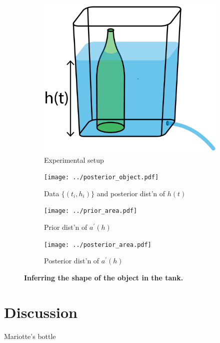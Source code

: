 \documentclass[openacc]{rsproca_new}%
\begin{document}
\begin{figure}[h!]
    \centering
        \begin{subfigure}[b]{0.3\textwidth}
    	\includegraphics[width=\textwidth]{../tank_geometry/tank_w_bottle.pdf}
	\caption{Experimental setup} \label{fig:tank_w_bottle}
    \end{subfigure}
     \begin{subfigure}[b]{0.49\textwidth}
    	\texttt{[image: ../posterior\_object.pdf]}
	\caption{Data $\{(t_i, h_i)\}$ and posterior dist'n of $h(t)$} \label{fig:posterior_object}
    \end{subfigure}
    
     \begin{subfigure}[b]{0.49\textwidth}
    	\texttt{[image: ../prior\_area.pdf]}
	\caption{Prior dist'n of $a^\prime(h)$} \label{fig:prior_area.pdf}
    \end{subfigure}
       \begin{subfigure}[b]{0.49\textwidth}
    	\texttt{[image: ../posterior\_area.pdf]}
	\caption{Posterior dist'n of $a^\prime(h)$} \label{fig:posterior_area.pdf}
    \end{subfigure}
    
  
    \caption{
      \textbf{Inferring the shape of the object in the tank.}
      }
\end{figure}

\section{Discussion}

Mariotte's bottle \cite{kirevs2006mariotte}

\enlargethispage{20pt}




\vskip2pc



\end{document}

